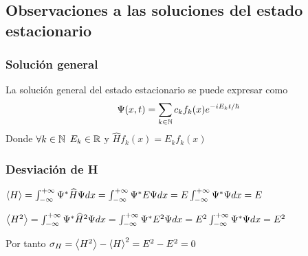 \subsection{Observaciones a las soluciones del estado estacionario}

\subsubsection{Solución general}
La solución general del estado estacionario se puede expresar como
\begin{equation}
    \label{solucion_general_estado_estacionario}
    \Psi(x,t)=\sum_{k\in\mathbb{N}}c_k f_k(x)e^{-iE_k t/\hbar}
\end{equation}
Donde $\forall k\in\mathbb{N}$ $E_k\in\mathbb{R}$ y $\widehat{H}f_k(x)=E_k f_k(x)$

\subsubsection{Desviación de H}
$\left\langle H\right\rangle = \int_{-\infty}^{+\infty}\Psi^* \widehat{H}\Psi dx = \int_{-\infty}^{+\infty}\Psi^* E\Psi dx=E\int_{-\infty}^{+\infty}\Psi^* \Psi dx = E$

$\left\langle H^2\right\rangle = \int_{-\infty}^{+\infty}\Psi^* \widehat{H}^2\Psi dx = \int_{-\infty}^{+\infty}\Psi^* E^2\Psi dx=E^2\int_{-\infty}^{+\infty}\Psi^* \Psi dx = E^2$

Por tanto $\sigma_H=\left\langle H^2\right\rangle-\left\langle H\right\rangle^2=E^2-E^2=0$

